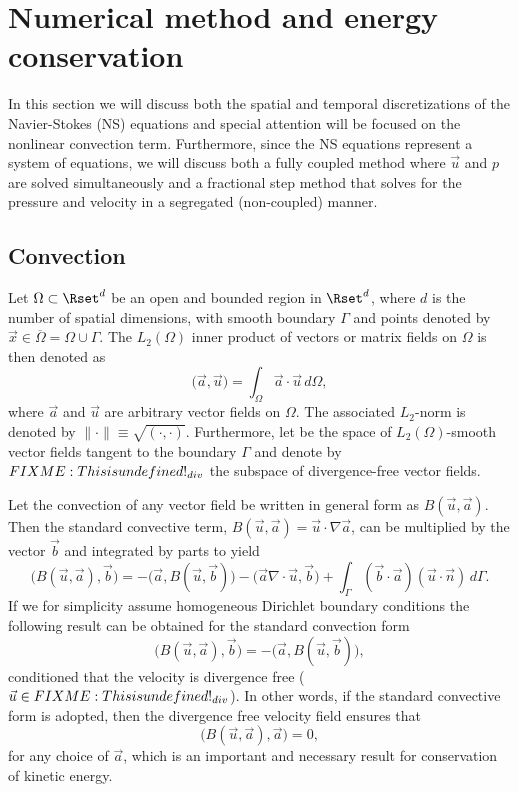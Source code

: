 \section{Numerical method and energy conservation}
\label{sec:Numerical}

In this section we will discuss both the spatial and temporal
discretizations of the Navier-Stokes (NS) equations and special
attention will be focused on the nonlinear convection
term. Furthermore, since the NS equations represent a system of
equations, we will discuss both a fully coupled method where $\vec{u}$
and $p$ are solved simultaneously and a fractional step method that
solves for the pressure and velocity in a segregated (non-coupled)
manner.

\subsection{Convection}
\label{sec:Convection}
Let $\Omega \subset \Rset^d$ be an open and bounded region in
$\Rset^d$, where $d$ is the number of spatial dimensions, with smooth
boundary $\Gamma$ and points denoted by
$\vec{x}\in \overline{\Omega}=\Omega \cup \Gamma$. The $L_2(\Omega)$
inner product of vectors or matrix fields on $\Omega$ is then denoted
as
\begin{equation}
 \bigl( \vec{a},\vec{u} \bigr) = \int_{\Omega} \vec{a}\cdot \vec{u}\, d\Omega,
 \label{eq:L2}
\end{equation}
where $\vec{a}$ and $\vec{u}$ are arbitrary vector fields on
$\Omega$. The associated $L_2$-norm is denoted by
$\| \cdot \| \equiv \sqrt{\left( \cdot, \cdot \right)}$. Furthermore,
let \Hset be the space of $L_2(\Omega)$-smooth vector fields tangent
to the boundary $\Gamma$ and denote by $FIXME: This is undefined!_{div}$ the subspace of
divergence-free vector fields.

Let the convection of any vector field be written in general form as
$B(\vec{u},\vec{a})$. Then the standard convective term,
$B(\vec{u},\vec{a}) = \vec{u}\cdot \nabla \vec{a} $, can be multiplied
by the vector $\vec{b}$ and integrated by parts to yield
\begin{equation}
 \bigl( B(\vec{u}, \vec{a}), \vec{b}\bigr) = -\bigl( \vec{a}, B(\vec{u},\vec{b})\bigr) - \bigl( \vec{a} \nabla \cdot \vec{u} , \vec{b} \bigr) + \int_{\Gamma} \left(\vec{b} \cdot \vec{a} \right)\left(\vec{u} \cdot \vec{n} \right) \, d\Gamma.
\label{eq:Bu1}
\end{equation}
If we for simplicity assume homogeneous Dirichlet boundary conditions
the following result can be obtained for the standard convection form
\begin{equation}
\bigl( B(\vec{u},\vec{a}), \vec{b} \bigr) = -\bigl( \vec{a}, B(\vec{u},\vec{b}) \bigr),
\label{eq:Bu2}
\end{equation}
conditioned that the velocity is divergence free
($\vec{u}\in FIXME: This is undefined!_{div}$). In other words, if the standard convective
form is adopted, then the divergence free velocity field ensures that
\begin{equation}
\bigl( B(\vec{u}, \vec{a}), \vec{a} \bigr) = 0,
\label{eq:B0}
\end{equation}
for any choice of $\vec{a}$, which is an important and necessary
result for conservation of kinetic energy.


